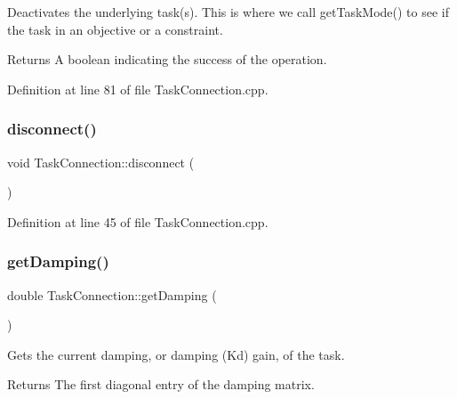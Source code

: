 Deactivates the underlying task(s). This is where we call get\+Task\+Mode() to see if the task in an objective or a constraint.

\begin{DoxyReturn}{Returns}
A boolean indicating the success of the operation. 
\end{DoxyReturn}


Definition at line 81 of file Task\+Connection.\+cpp.

\hypertarget{classocra__recipes_1_1TaskConnection_a66f5d60e3690f959135319ed85778de8}{}\label{classocra__recipes_1_1TaskConnection_a66f5d60e3690f959135319ed85778de8} 
\subsubsection{\texorpdfstring{disconnect()}{disconnect()}}
{\footnotesize\ttfamily void Task\+Connection\+::disconnect (\begin{DoxyParamCaption}{ }\end{DoxyParamCaption})}



Definition at line 45 of file Task\+Connection.\+cpp.

\hypertarget{classocra__recipes_1_1TaskConnection_a7d659e4a155f8a0942bb71d193b95385}{}\label{classocra__recipes_1_1TaskConnection_a7d659e4a155f8a0942bb71d193b95385} 
\subsubsection{\texorpdfstring{get\+Damping()}{getDamping()}}
{\footnotesize\ttfamily double Task\+Connection\+::get\+Damping (\begin{DoxyParamCaption}{ }\end{DoxyParamCaption})}

Gets the current damping, or damping (Kd) gain, of the task.

\begin{DoxyReturn}{Returns}
The first diagonal entry of the damping matrix. 
\end{DoxyReturn}


